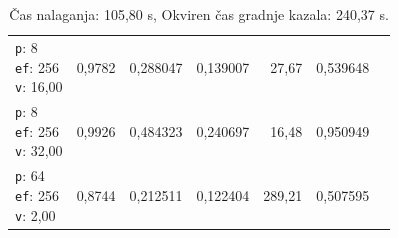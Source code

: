 \begin{table}[htbp]
\begin{tabularx}{\textwidth}{Xrrrrrr}
    \makecell{\texttt{p}: 8\\\texttt{ef}: 256\\\texttt{v}: 16,00} & 0,9782 & 0,288047 & 0,139007 & 27,67 & 0,539648 \\
    \makecell{\texttt{p}: 8\\\texttt{ef}: 256\\\texttt{v}: 32,00} & 0,9926 & 0,484323 & 0,240697 & 16,48 & 0,950949 \\
    \makecell{\texttt{p}: 64\\\texttt{ef}: 256\\\texttt{v}: 2,00} & 0,8744 & 0,212511 & 0,122404 & 289,21 & 0,507595 \\
    \bottomrule
  \end{tabularx}
\caption* {Čas nalaganja: 105,80 s, Okviren čas gradnje kazala: 240,37 s.}\end{table}


\clearpage



